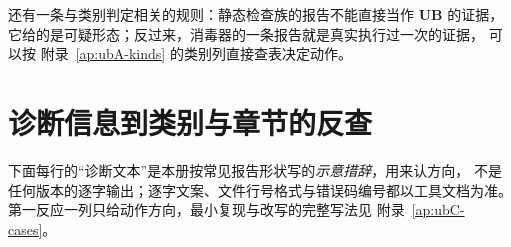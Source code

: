 \documentclass[12pt,a4paper,fontset=fandol]{ctexbook}
\newcommand{\UB}{\textbf{\textsf{UB}}}
\begin{document}
还有一条与类别判定相关的规则：静态检查族的报告不能直接当作 \UB{} 的证据，
它给的是可疑形态；反过来，消毒器的一条报告就是真实执行过一次的证据，
可以按 附录~\ref{ap:ubA-kinds} 的类别列直接查表决定动作。

\section{诊断信息到类别与章节的反查}

\begin{guideline}[title=反查表怎么用]
下面每行的“诊断文本”是本册按常见报告形状写的\emph{示意措辞}，用来认方向，
不是任何版本的逐字输出；逐字文案、文件行号格式与错误码编号都以工具文档为准。
第一反应一列只给动作方向，最小复现与改写的完整写法见 附录~\ref{ap:ubC-cases}。
\end{guideline}
\end{document}
